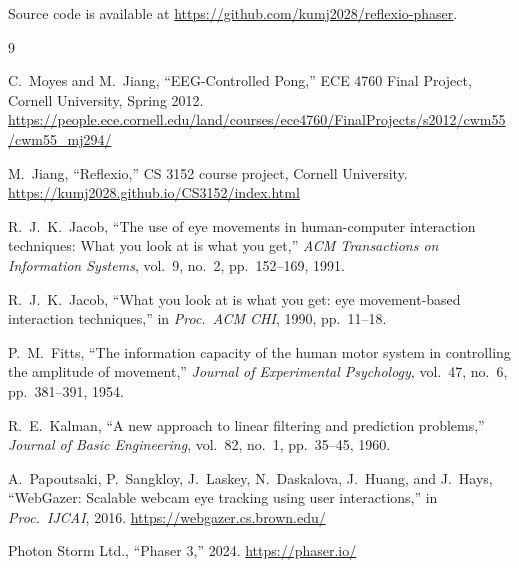 \documentclass[11pt,twocolumn]{article}
\begin{document}
Source code is available at \url{https://github.com/kumj2028/reflexio-phaser}.

\begin{thebibliography}{9}

C.\ Moyes and M.\ Jiang,
``EEG-Controlled Pong,''
ECE 4760 Final Project, Cornell University, Spring 2012.
\url{https://people.ece.cornell.edu/land/courses/ece4760/FinalProjects/s2012/cwm55/cwm55_mj294/}

M.\ Jiang,
``Reflexio,''
CS 3152 course project, Cornell University.
\url{https://kumj2028.github.io/CS3152/index.html}

R.\ J.\ K.\ Jacob,
``The use of eye movements in human-computer interaction techniques: What you look at is what you get,''
\textit{ACM Transactions on Information Systems}, vol.~9, no.~2, pp.~152--169, 1991.

R.\ J.\ K.\ Jacob,
``What you look at is what you get: eye movement-based interaction techniques,''
in \textit{Proc.\ ACM CHI}, 1990, pp.~11--18.

P.\ M.\ Fitts,
``The information capacity of the human motor system in controlling the amplitude of movement,''
\textit{Journal of Experimental Psychology}, vol.~47, no.~6, pp.~381--391, 1954.

R.\ E.\ Kalman,
``A new approach to linear filtering and prediction problems,''
\textit{Journal of Basic Engineering}, vol.~82, no.~1, pp.~35--45, 1960.

A.\ Papoutsaki, P.\ Sangkloy, J.\ Laskey, N.\ Daskalova, J.\ Huang, and J.\ Hays,
``WebGazer: Scalable webcam eye tracking using user interactions,''
in \textit{Proc.\ IJCAI}, 2016.
\url{https://webgazer.cs.brown.edu/}

Photon Storm Ltd.,
``Phaser 3,'' 2024.
\url{https://phaser.io/}

\end{thebibliography}
\end{document}
